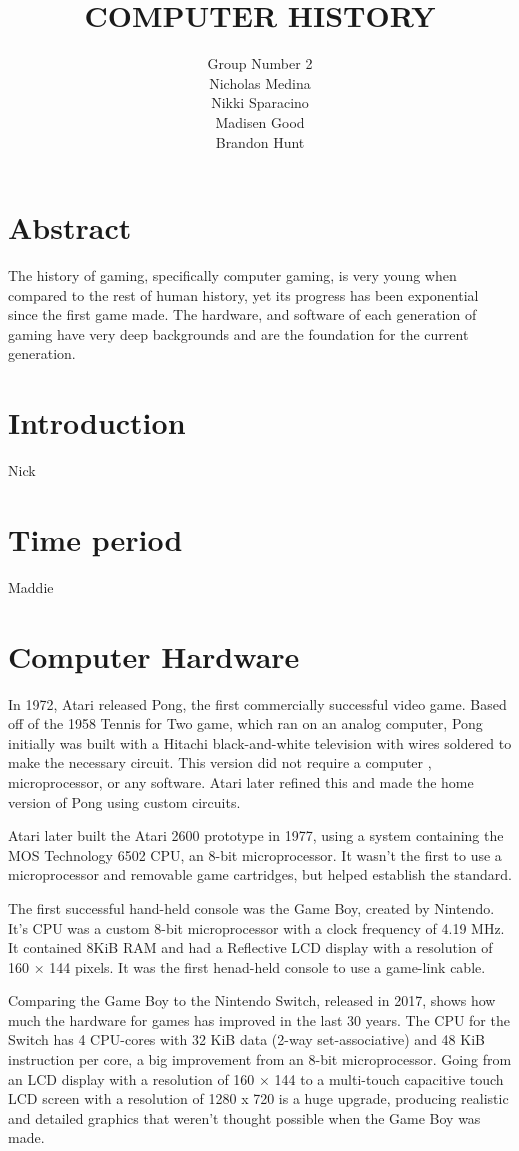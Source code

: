 \documentclass[letterpaper, 10 pt, conference]{IEEEconf}
\title{\LARGE \bf
COMPUTER HISTORY\\
\large
}
\author{Group Number 2\\
\small Nicholas Medina\\
\small Nikki Sparacino\\
\small Madisen Good\\
\small Brandon Hunt\\
}
\begin{document}
\maketitle 

\section{Abstract}

The history of gaming, specifically computer gaming, is very young when compared
to the rest of human history, yet its progress has been exponential since the first
game made. The hardware, and software of each generation of gaming have very deep
backgrounds and are the foundation for the current generation.

\section{Introduction}
Nick
\section{Time period}
Maddie
\section{Computer Hardware}
In 1972, Atari released Pong,  the first commercially successful video game. 
Based off of the 1958 Tennis for Two game, which ran on an analog computer, 
Pong initially was built  with a Hitachi black-and-white television with wires
soldered to make the necessary circuit. This version did not require a computer
, microprocessor, or any software. Atari later refined this and made the home 
version of Pong using custom circuits.

Atari later built the Atari 2600 prototype in 1977, using a system containing
the MOS Technology 6502 CPU, an 8-bit microprocessor. It wasn’t the first to 
use a microprocessor and removable game cartridges, but helped establish the 
standard.

The first successful hand-held console was the Game Boy, created by Nintendo. 
It’s CPU was a custom 8-bit microprocessor with a clock frequency of 4.19 MHz.
It contained 8KiB RAM and had a Reflective LCD display with a resolution of 
160 × 144 pixels. It was the first henad-held console to use a game-link cable.

Comparing the Game Boy to the Nintendo Switch, released in 2017, shows how much
the hardware for games has improved in the last 30 years. The CPU for the Switch 
has 4 CPU-cores with 32 KiB data (2-way set-associative) and 48 KiB instruction 
per core, a big improvement from an 8-bit microprocessor. Going from an LCD display
with a resolution of 160 × 144 to a multi-touch capacitive touch LCD screen with
a resolution of 1280 x 720 is a huge upgrade, producing realistic and detailed graphics
that weren’t thought possible when the Game Boy was made.
\end{document}
